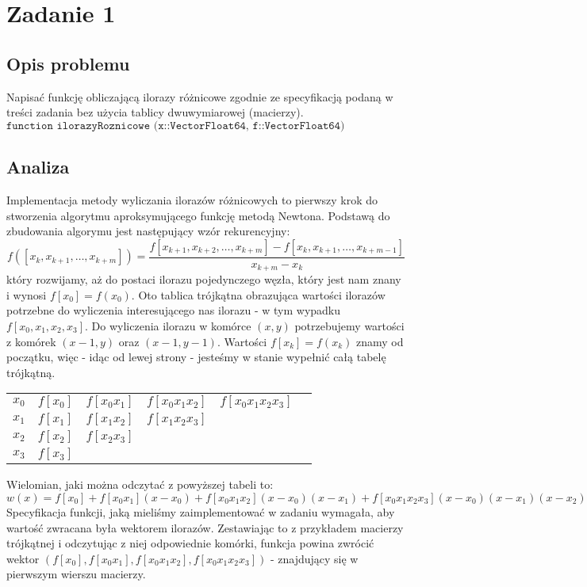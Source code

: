 \section{Zadanie 1}
\subsection{Opis problemu}
Napisać funkcję obliczającą ilorazy różnicowe zgodnie ze specyfikacją podaną w treści zadania bez użycia tablicy dwuwymiarowej (macierzy). \\ $ \texttt{function ilorazyRoznicowe (x::Vector{Float64}, f::Vector{Float64})} $ \\
\subsection{Analiza}
Implementacja metody wyliczania ilorazów różnicowych to pierwszy krok do stworzenia algorytmu aproksymującego funkcję metodą Newtona. Podstawą do zbudowania algorymu jest następujący wzór rekurencyjny:
$$ f([x_k, x_{k+1}, \ldots, x_{k+m}]) = \frac{f[x_{k+1}, x_{k+2},\ldots,x_{k+m}] - f[x_k, x_{k+1}, \ldots, x_{k+m-1}]}{x_{k+m} - x_k}$$
który rozwijamy, aż do postaci ilorazu pojedynczego węzła, który jest nam znany i wynosi $ f[x_0] = f(x_0)$.
Oto tablica trójkątna obrazująca wartości ilorazów potrzebne do wyliczenia interesującego nas ilorazu - w tym wypadku $ f[x_0, x_1, x_2, x_3] $. Do wyliczenia ilorazu w komórce $(x, y)$ potrzebujemy wartości z komórek $(x - 1, y) $ oraz $(x - 1, y - 1)$. Wartości $f[x_k] = f(x_k)$ znamy od początku, więc - idąc od lewej strony - jesteśmy w stanie wypełnić całą tabelę trójkątną.  \\
\renewcommand{\arraystretch}{1.5}
\begin{center}
  \begin{tabular}{ c | c c c c c }
    $ x_0 $ & $ f[x_0] $ & $ f[x_0 x_1] $ & $ f[x_0 x_1 x_2] $ & $ f[x_0 x_1 x_2 x_3] $\\
    $ x_1 $ & $ f[x_1] $ & $ f[x_1 x_2] $ & $ f[x_1 x_2 x_3] $ \\
    $ x_2 $ & $ f[x_2] $ & $ f[x_2 x_3] $\\
    $ x_3 $ & $ f[x_3] $ 
  \end{tabular}
\end{center}
Wielomian, jaki można odczytać z powyższej tabeli to:
$$ w(x) = f[x_0] + f[x_0 x_1](x - x_0) + f[x_0 x_1 x_2](x - x_0)(x - x_1) + f[x_0 x_1 x_2 x_3](x - x_0)(x - x_1)(x - x_2) $$
Specyfikacja funkcji, jaką mieliśmy zaimplementować w zadaniu wymagała, aby wartość zwracana była wektorem ilorazów. Zestawiając to z przykładem macierzy trójkątnej i odczytując z niej odpowiednie komórki, funkcja powina zwrócić wektor $(f[x_0], f[x_0 x_1], f[x_0 x_1 x_2], f[x_0 x_1 x_2 x_3])$ - znajdujący się w pierwszym wierszu macierzy.

